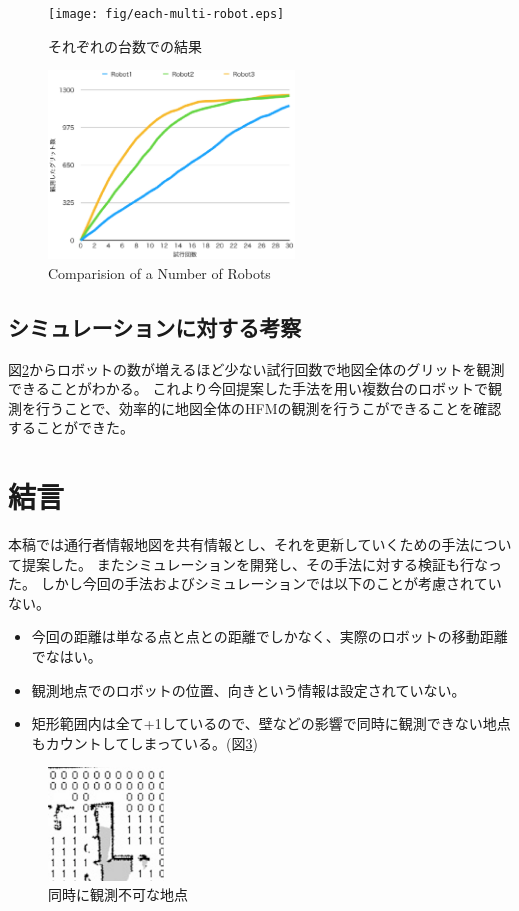 \documentclass{jsarticle}
\begin{document}
\begin{figure}[tbh]
 \centering
  \texttt{[image: fig/each-multi-robot.eps]}
  \vspace*{-4mm}
  \caption{それぞれの台数での結果}
  \label{fig: each-multirobot}
\end{figure}

\begin{figure}[tbh]
 \centering
  \includegraphics[height=50mm]{fig/multi-robot.eps}
  \vspace*{-4mm}
  \caption{Comparision of a Number of Robots}
  \label{fig: multirobot}
\end{figure}


\subsection{シミュレーションに対する考察}
図\ref{fig: multirobot}からロボットの数が増えるほど少ない試行回数で地図全体のグリットを観測できることがわかる。
これより今回提案した手法を用い複数台のロボットで観測を行うことで、効率的に地図全体のHFMの観測を行うこができることを確認することができた。




\section{結言}
本稿では通行者情報地図を共有情報とし、それを更新していくための手法について提案した。
またシミュレーションを開発し、その手法に対する検証も行なった。
しかし今回の手法およびシミュレーションでは以下のことが考慮されていない。
\begin{itemize}
  \item 今回の距離は単なる点と点との距離でしかなく、実際のロボットの移動距離でなはい。
  \item 観測地点でのロボットの位置、向きという情報は設定されていない。
  \item 矩形範囲内は全て+1しているので、壁などの影響で同時に観測できない地点もカウントしてしまっている。(図\ref{fig: impossible})
\end{itemize}
\begin{figure}[tbh]
 \centering
  \includegraphics[height=30mm]{fig/impossible.eps}
  \vspace*{-4mm}
  \caption{同時に観測不可な地点}
  \label{fig: impossible}
\end{figure}
\end{document}
